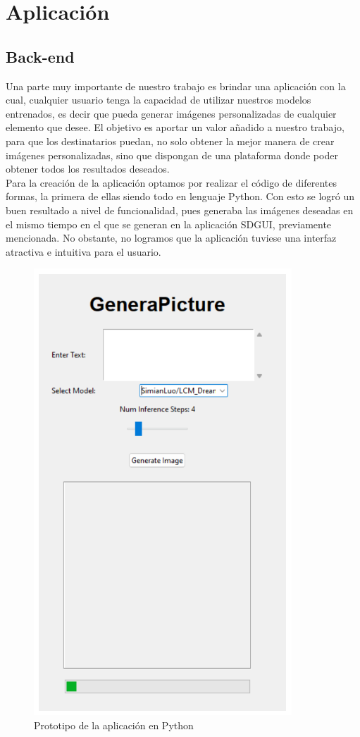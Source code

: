 \chapter{Aplicación}
\label{cap:descripcionTrabajo}

\section{Back-end}
Una parte muy importante de nuestro trabajo es brindar una aplicación con la cual, cualquier usuario tenga la capacidad de utilizar nuestros modelos entrenados, es decir que pueda generar imágenes personalizadas de cualquier elemento que desee. El objetivo es aportar un valor añadido a nuestro trabajo, para que los destinatarios puedan, no solo obtener la mejor manera de crear imágenes personalizadas, sino que dispongan de una plataforma donde poder obtener todos los resultados deseados.\\

Para la creación de la aplicación optamos por realizar el código de diferentes formas, la primera de ellas siendo todo en lenguaje Python. Con esto se logró un buen resultado a nivel de funcionalidad, pues generaba las imágenes deseadas en el mismo tiempo en el que se generan en la aplicación SDGUI, previamente mencionada. No obstante, no logramos que la aplicación tuviese una interfaz atractiva e intuitiva para el usuario.\\

\begin{figure}[!htb]
	\centering
	\includegraphics[width = 0.5
	\textwidth]{Imagenes/Vectorial/app1.png}
	\caption{Prototipo de la aplicación en Python}
	\label{fig:app1}
\end{figure}

